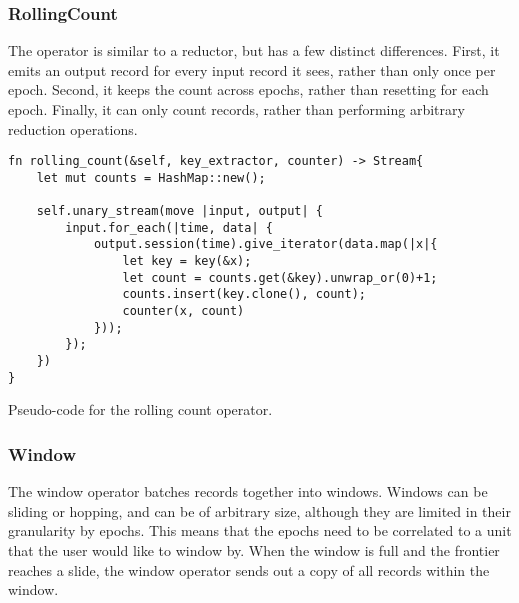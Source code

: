 \subsubsection{RollingCount}
The  operator is similar to a reductor, but has a few distinct differences. First, it emits an output record for every input record it sees, rather than only once per epoch. Second, it keeps the count across epochs, rather than resetting for each epoch. Finally, it can only count records, rather than performing arbitrary reduction operations.

\begin{listing}[H]
\begin{verbatim}
fn rolling_count(&self, key_extractor, counter) -> Stream{
    let mut counts = HashMap::new();
    
    self.unary_stream(move |input, output| {
        input.for_each(|time, data| {
            output.session(time).give_iterator(data.map(|x|{
                let key = key(&x);
                let count = counts.get(&key).unwrap_or(0)+1;
                counts.insert(key.clone(), count);
                counter(x, count)
            }));
        });
    })
}
\end{verbatim}
  \caption{Pseudo-code for the rolling count operator.}
  \label{lst:reduce-to}
\end{listing}

\subsubsection{Window}
The window operator batches records together into windows. Windows can be sliding or hopping, and can be of arbitrary size, although they are limited in their granularity by epochs. This means that the epochs need to be correlated to a unit that the user would like to window by. When the window is full and the frontier reaches a slide, the window operator sends out a copy of all records within the window.

